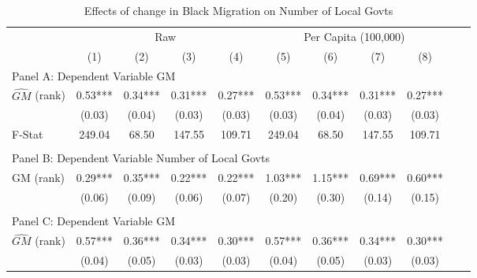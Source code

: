  \begin{table}[htbp]\centering {} \begin{threeparttable} \caption{Effects of change in Black Migration on Number of Local Govts} \begin{tabular}{l*{10}{c}} \toprule
                &\multicolumn{4}{c}{Raw}                                    &\multicolumn{4}{c}{Per Capita (100,000)}                   \\\cmidrule(lr){2-5}\cmidrule(lr){6-9}
                &\multicolumn{1}{c}{(1)}   &\multicolumn{1}{c}{(2)}   &\multicolumn{1}{c}{(3)}   &\multicolumn{1}{c}{(4)}   &\multicolumn{1}{c}{(5)}   &\multicolumn{1}{c}{(6)}   &\multicolumn{1}{c}{(7)}   &\multicolumn{1}{c}{(8)}   \\
\cmidrule(lr){1-9}
\multicolumn{8}{l}{Panel A: Dependent Variable GM}\\
\cmidrule(lr){1-9}
$\hat{GM}$ (rank)&       0.53***&       0.34***&       0.31***&       0.27***&       0.53***&       0.34***&       0.31***&       0.27***\\
                &     (0.03)   &     (0.04)   &     (0.03)   &     (0.03)   &     (0.03)   &     (0.04)   &     (0.03)   &     (0.03)   \\
\midrule
F-Stat          &     249.04   &      68.50   &     147.55   &     109.71   &     249.04   &      68.50   &     147.55   &     109.71   \\
\cmidrule[\heavyrulewidth](lr){1-9} \\ \cmidrule[\heavyrulewidth](lr){1-9}
\multicolumn{8}{l}{Panel B: Dependent Variable Number of Local Govts}\\
\cmidrule(lr){1-9}
GM  (rank)      &       0.29***&       0.35***&       0.22***&       0.22***&       1.03***&       1.15***&       0.69***&       0.60***\\
                &     (0.06)   &     (0.09)   &     (0.06)   &     (0.07)   &     (0.20)   &     (0.30)   &     (0.14)   &     (0.15)   \\
\cmidrule[\heavyrulewidth](lr){1-9} \\ \cmidrule[\heavyrulewidth](lr){1-9}
\multicolumn{8}{l}{Panel C: Dependent Variable GM}\\
\cmidrule(lr){1-9}
$\hat{GM}$ (rank)&       0.57***&       0.36***&       0.34***&       0.30***&       0.57***&       0.36***&       0.34***&       0.30***\\
                &     (0.04)   &     (0.05)   &     (0.03)   &     (0.03)   &     (0.04)   &     (0.05)   &     (0.03)   &     (0.03)   \\

\end{tabular}
\end{threeparttable}
\end{table}
